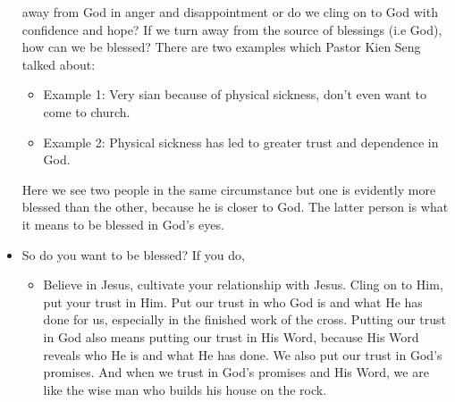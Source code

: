 \begin{itemize}
{  away from God in anger and disappointment or do we cling on to God with
  confidence and hope?  If we turn away from the source of blessings (i.e
  God), how can we be blessed? There are two examples which Pastor Kien Seng talked about:
  \begin{itemize}
    \item{Example 1: Very sian because of physical sickness, don't even want
    to come to church.}
    \item{Example 2: Physical sickness has led to greater trust and
    dependence in God.}
  \end{itemize}
  Here we see two people in the same circumstance but one is evidently more
  blessed than the other, because he is closer to God. The latter person is what it means to be blessed in God's eyes.}
  \item{So do you want to be blessed?  If you do,
  \begin{itemize}
    \item{Believe in Jesus, cultivate your relationship with Jesus.  Cling on
    to Him, put your trust in Him.  Put our trust in who God is and what He
    has done for us, especially in the finished work of the cross.  Putting
    our trust in God also means putting our trust in His Word, because His
    Word reveals who He is and what He has done.  We also put our trust in
    God's promises.  And when we trust in God's promises and His Word, we are
    like the wise man who builds his house on the rock.}
  \end{itemize}}
\end{itemize}

















